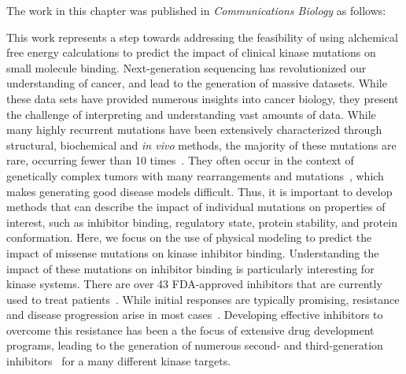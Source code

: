 \documentclass[phd,tocprelim]{cornell}
\begin{document}
The work in this chapter was published in \emph{Communications Biology} as follows: 
\realsinglespacing
{}
\realdoublespacing
 
\medskip
This work represents a step towards addressing the feasibility of using alchemical free energy calculations to predict the impact of clinical kinase mutations on small molecule binding. Next-generation sequencing has revolutionized our understanding of cancer, and lead to the generation of massive datasets. While these data sets have provided numerous insights into cancer biology, they present the challenge of interpreting and understanding vast amounts of data. While many highly recurrent mutations have been extensively characterized through structural, biochemical and \emph{in vivo} methods, the majority of these mutations are rare, occurring fewer than 10 times~\citep{Hauser:2018vz}. They often occur in the context of genetically complex tumors with many rearrangements and mutations~\citep{Zehir:2017ib}, which makes generating good disease models difficult.  Thus, it is important to develop methods that can describe the impact of individual mutations on properties of interest, such as inhibitor binding, regulatory state, protein stability, and protein conformation. Here, we focus on the use of physical modeling to predict the impact of missense mutations on kinase inhibitor binding. Understanding the impact of these mutations on inhibitor binding is particularly interesting for kinase systems. There are over 43 FDA-approved inhibitors that are currently used to treat patients~\citep{fda-approved-kinase-inhibitors}. While initial responses are typically promising, resistance and disease progression arise in most cases~\citep{knight-shokat:2005:chem-biol:selective-kinase-inhibitors,Pao:2005dp,Pao2004-kx}. Developing effective inhibitors to overcome this resistance has been a the focus of extensive drug development programs, leading to the generation of numerous second- and third-generation inhibitors~\citep{Chuang:2016jw,Tan:2018de,Gainor:2016ep} for a many different kinase targets. 
\end{document}
